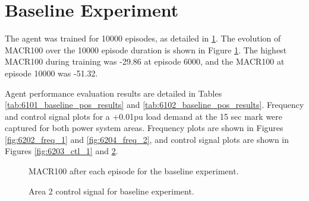 \section{Baseline Experiment}\label{sec:baseline}
The agent was trained for 10000 episodes, as detailed in \textsection \ref{sec:baseline}. The evolution of MACR100 over the 10000 episode duration is shown in Figure \ref{fig:6201_average_reward}. The highest MACR100 during training was -29.86 at episode 6000, and the MACR100 at episode 10000 was -51.32.

Agent performance evaluation results are detailed in Tables \ref{tab:6101_baseline_pos_results} and \ref{tab:6102_baseline_pos_results}. Frequency and control signal plots for a +0.01pu load demand at the 15 sec mark were captured for both power system areas. Frequency plots are shown in Figures \ref{fig:6202_freq_1} and \ref{fig:6204_freq_2}, and control signal plots are shown in Figures \ref{fig:6203_ctl_1} and \ref{fig:6205_ctl_2}.

\begin{figure}[h]
	\centering
	
	\caption{MACR100 after each episode for the baseline experiment.}
	\label{fig:6201_average_reward}
\end{figure}





\begin{figure}[h]
	\centering
	
	\vspace{-0.5cm}
	\caption[Experiment 1 Area 1 frequency]{Area 1 frequency response for baseline experiment.}\label{fig:6202_freq_1}
	
	\vspace{0.5cm}
	
	
	\vspace{-0.5cm}
	\caption[Experiment 1 Area 1 control signal]{Area 1 control signal for baseline experiment.}\label{fig:6203_ctl_1}
	
	\vspace{0.5cm}
	
	
	\vspace{-0.5cm}
	\caption[Experiment 1 Area 2 frequency]{Area 2 frequency response for baseline experiment.}\label{fig:6204_freq_2}
	
	\vspace{0.5cm}
		
	
	\vspace{-0.5cm}
	\caption[Experiment 1 Area 2 control signal]{Area 2 control signal for baseline experiment.}\label{fig:6205_ctl_2}
\end{figure}